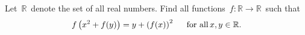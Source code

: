 Let $\,{\mathbb{R}}\,$ denote the set of all real numbers. Find all functions $\,f: {\mathbb{R}}\rightarrow {\mathbb{R}}\,$ such that \[ f\left( x^{2}+f(y)\right) =y+\left( f(x)\right) ^{2}\hspace{0.2in}\text{for all}\,x,y\in \mathbb{R}. \]